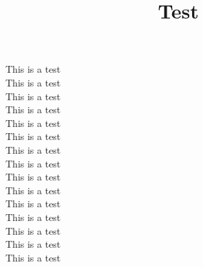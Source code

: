 \documentclass[]{instagram}
\title{Test}
\begin{document}
\maketitle
\vfill
This is a test \\
This is a test \\
This is a test \\
This is a test \\
This is a test \\
This is a test \\
This is a test \\
This is a test \\
\vfill \newpage \null\vfill
This is a test \\
This is a test \\
This is a test \\
This is a test \\
This is a test \\
This is a test \\
This is a test \\
\vfill
\end{document}
